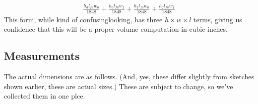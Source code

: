 \documentclass[letterpaper,10pt,english]{sphinxmanual}
\begin{document}
\begin{sphinxVerbatim}[commandchars=\\\{\}]
        
\end{sphinxVerbatim}
\begin{equation*}
\begin{split}\displaystyle \frac{h_{a} l_{fa} w_{a}}{1848} + \frac{h_{a} l_{fa} w_{f}}{1848} + \frac{h_{f} l_{fa} w_{a}}{1848} + \frac{h_{f} l_{fa} w_{f}}{1848}\end{split}
\end{equation*}
\sphinxAtStartPar
This form, while kind of confusing\sphinxhyphen{}looking, has three \(h \times w \times l\) terms, giving us confidence that this will be a proper volume computation in cubic inches.


\subsection{Measurements}
\label{\detokenize{prism:measurements}}
\sphinxAtStartPar
The actual dimensions are as follows.
(And, yes, these differ slightly from sketches shown earlier, these are actual sizes.) These are subject to change, so we’ve collected them in one plce.

\begin{sphinxVerbatim}[commandchars=\\\{\}]
  
     
        

     
     

     
\end{sphinxVerbatim}
\end{document}
